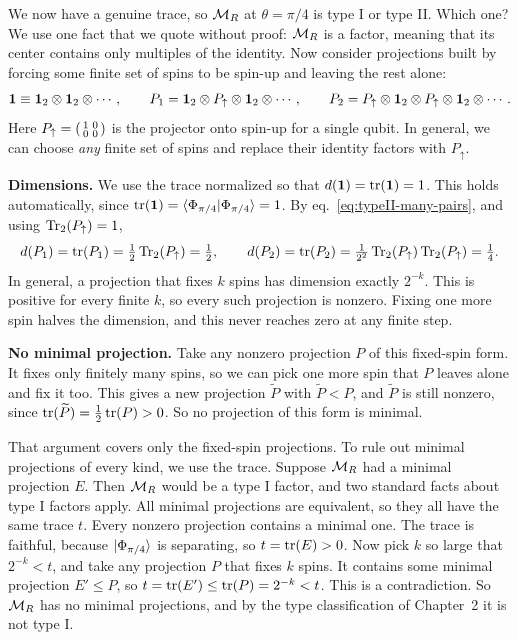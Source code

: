 We now have a genuine trace, so $\mathcal{M}_R$ at $\theta=\pi/4$ is type I or type II. Which one? We use one fact that
we quote without proof: $\mathcal{M}_R$ is a factor, meaning that its center contains only multiples of the identity.
Now consider projections
built by forcing some finite set of spins to be spin-up and leaving the rest alone:
\[
\mathbf{1} \equiv \mathbf{1}_2\otimes\mathbf{1}_2\otimes\cdots, \qquad
P_1 = \mathbf{1}_2\otimes P_\uparrow\otimes\mathbf{1}_2\otimes\cdots, \qquad
P_2 = P_\uparrow\otimes\mathbf{1}_2\otimes P_\uparrow\otimes\mathbf{1}_2\otimes\cdots .
\]
Here $P_\uparrow=\begin{psmallmatrix}1&0\\0&0\end{psmallmatrix}$ is the projector onto spin-up for a single
qubit. In general, we can choose \emph{any} finite set of spins and replace their identity factors with
$P_\uparrow$.

\textbf{Dimensions.} We use the trace normalized so that $d(\mathbf{1})=\operatorname{tr}(\mathbf{1})=1$. This holds automatically, since
$\operatorname{tr}(\mathbf{1})=\braket{\Phi_{\pi/4}|\Phi_{\pi/4}}=1$. By eq.~\eqref{eq:typeII-many-pairs}, and using
$\operatorname{Tr}_2(P_\uparrow)=1$,
\[
d(P_1)=\operatorname{tr}(P_1)=\tfrac12\operatorname{Tr}_2(P_\uparrow)=\tfrac12 , \qquad
d(P_2)=\operatorname{tr}(P_2)=\tfrac1{2^2}\operatorname{Tr}_2(P_\uparrow)\operatorname{Tr}_2(P_\uparrow)=\tfrac14 .
\]
In general, a projection that fixes $k$ spins has dimension exactly $2^{-k}$. This is positive for every finite
$k$, so every such projection is nonzero. Fixing one more spin halves the dimension, and this never reaches zero
at any finite step.

\textbf{No minimal projection.} Take any nonzero projection $P$ of this fixed-spin form. It fixes only finitely
many spins, so we can pick one more spin that $P$ leaves alone and fix it too. This gives a new projection
$\widetilde P$ with $\widetilde P<P$, and $\widetilde P$ is still nonzero, since $\operatorname{tr}(\widetilde P)=\tfrac12
\operatorname{tr}(P)>0$. So no projection of this form is minimal.

That argument covers only the fixed-spin projections. To rule out minimal projections of every kind, we use the
trace. Suppose $\mathcal{M}_R$ had a minimal projection $E$. Then $\mathcal{M}_R$ would be a type I factor, and two standard facts
about type I factors apply. All minimal projections are equivalent, so they all have the same trace $t$. Every
nonzero projection contains a minimal one. The trace is faithful, because $\ket{\Phi_{\pi/4}}$ is separating,
so $t=\operatorname{tr}(E)>0$. Now pick $k$ so large that $2^{-k}<t$, and take any projection $P$ that fixes $k$ spins. It
contains some minimal projection $E'\le P$, so $t=\operatorname{tr}(E')\le\operatorname{tr}(P)=2^{-k}<t$. This is a contradiction. So
$\mathcal{M}_R$ has no minimal projections, and by the type classification of Chapter~2 it is not type I.

